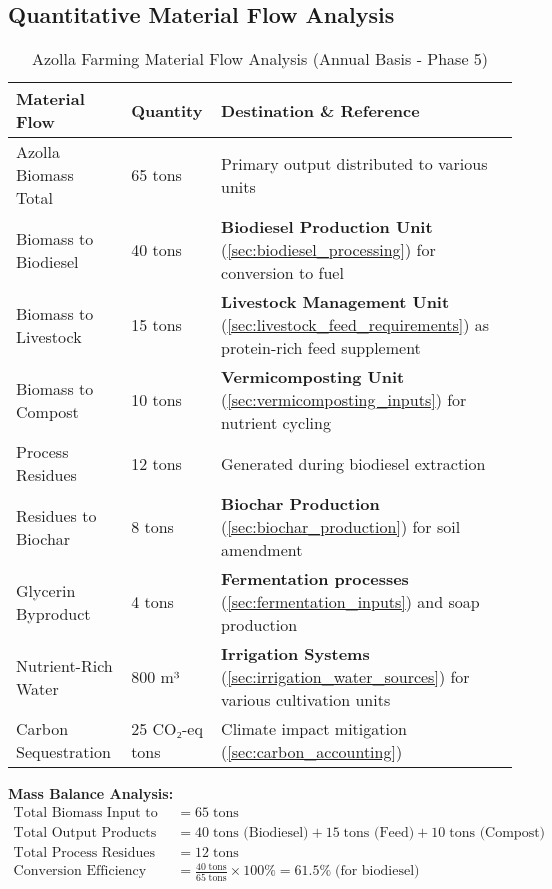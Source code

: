 \subsection{Quantitative Material Flow Analysis}
\begin{table}[h]
\centering
\caption{Azolla Farming Material Flow Analysis (Annual Basis - Phase 5)}
\label{tab:azolla_material_flow}
\begin{tabular}{|p{3cm}|p{2cm}|p{8cm}|}
\hline
\textbf{Material Flow} & \textbf{Quantity} & \textbf{Destination \& Reference} \\
\hline
Azolla Biomass Total & 65 tons & Primary output distributed to various units \\
\hline
Biomass to Biodiesel & 40 tons & \textbf{Biodiesel Production Unit} (\ref{sec:biodiesel_processing}) for conversion to fuel \\
\hline
Biomass to Livestock & 15 tons & \textbf{Livestock Management Unit} (\ref{sec:livestock_feed_requirements}) as protein-rich feed supplement \\
\hline
Biomass to Compost & 10 tons & \textbf{Vermicomposting Unit} (\ref{sec:vermicomposting_inputs}) for nutrient cycling \\
\hline
Process Residues & 12 tons & Generated during biodiesel extraction \\
\hline
Residues to Biochar & 8 tons & \textbf{Biochar Production} (\ref{sec:biochar_production}) for soil amendment \\
\hline
Glycerin Byproduct & 4 tons & \textbf{Fermentation processes} (\ref{sec:fermentation_inputs}) and soap production \\
\hline
Nutrient-Rich Water & 800 m³ & \textbf{Irrigation Systems} (\ref{sec:irrigation_water_sources}) for various cultivation units \\
\hline
Carbon Sequestration & 25 CO₂-eq tons & Climate impact mitigation (\ref{sec:carbon_accounting}) \\
\hline
\end{tabular}
\end{table}

\textbf{Mass Balance Analysis:}
\begin{align*}
\text{Total Biomass Input to Processing} &= 65\; \text{tons} \\
\text{Total Output Products} &= 40\; \text{tons (Biodiesel)} + 15\; \text{tons (Feed)} + 10\; \text{tons (Compost)} \\
\text{Total Process Residues} &= 12\; \text{tons} \\
\text{Conversion Efficiency} &= \frac{40\; \text{tons}}{65\; \text{tons}} \times 100\% = 61.5\%\; \text{(for biodiesel)}
\end{align*}

